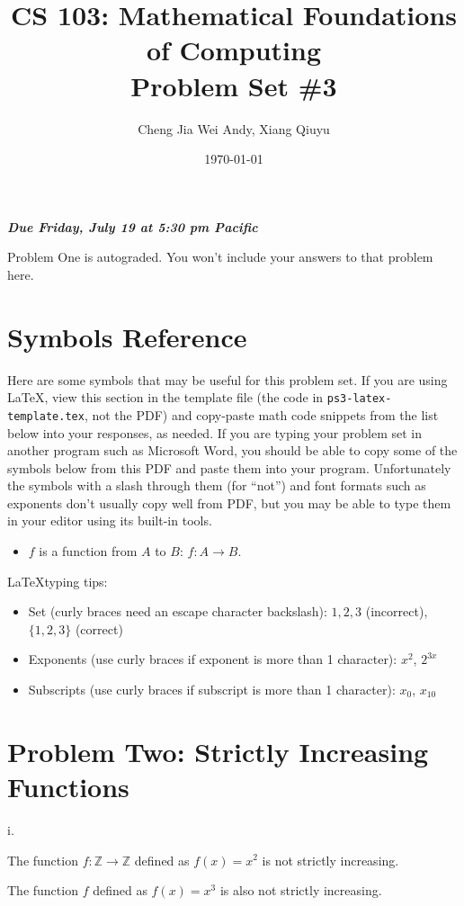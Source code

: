 \documentclass{article}
\title{CS 103: Mathematical Foundations of Computing\\Problem Set \#3}
\author{Cheng Jia Wei Andy, Xiang Qiuyu}
\date{\today}
\renewcommand{\(}{\left(}
\renewcommand{\)}{\right)}
\renewcommand{\emph}[1]{\textit{\textbf{#1}}}
\theoremstyle{plain}
\theoremstyle{plain}
\theoremstyle{definition}
\begin{document}
\maketitle

\begin{center}
  \emph{Due Friday, July 19 at 5:30 pm Pacific}
\end{center}

\vspace{1cm}

Problem One is autograded. You won't include your answers to that problem here.

\section*{Symbols Reference}
Here are some symbols that may be useful for this problem set. If you are using \LaTeX, view this section in the template file (the code in \texttt{ps3-latex-template.tex}, not the PDF) and copy-paste math code snippets from the list below into your responses, as needed. If you are typing your problem set in another program such as Microsoft Word, you should be able to copy some of the symbols below from this PDF and paste them into your program. Unfortunately the symbols with a slash through them (for ``not'') and font formats such as exponents don't usually copy well from PDF, but you may be able to type them in your editor using its built-in tools.
\begin{itemize}
    \item $f$ is a function from $A$ to $B$: $f : A \to B$.
\end{itemize}

\LaTeX typing tips:
\begin{itemize}
    \item Set (curly braces need an escape character backslash): ${1, 2, 3}$ (incorrect), $\{1, 2, 3\}$ (correct)
    \item Exponents (use curly braces if exponent is more than 1 character): $x^2$, $2^{3x}$
    \item Subscripts (use curly braces if subscript is more than 1 character): $x_0$, $x_{10}$
\end{itemize}

\newpage

\section*{Problem Two: Strictly Increasing Functions}
    i.
    \begin{shaded}
        The function $f:\mathbb{Z}\to\mathbb{Z}$ defined as $f(x)=x^{2}$ is not strictly increasing.

        \vspace{4mm}

        The function $f$ defined as $f(x)=x^{3}$ is also not strictly increasing.
    \end{shaded}
    
\end{document}
